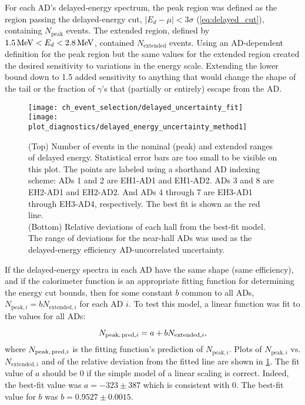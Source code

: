 For each AD's delayed-energy spectrum, the peak region was defined as
the region passing the delayed-energy cut, $\vert E_d-\mu \vert < 3\sigma$
(\cref{eq:delayed_cut}), containing $N_\text{peak}$ events.
The extended region, defined by
$\SI{1.5}{\mega\electronvolt} < E_d < \SI{2.8}{\mega\electronvolt}$,
contained $N_\text{extended}$ events.
Using an AD-dependent definition for the peak region but
the same values for the extended region created
the desired sensitivity to variations in the energy scale.
Extending the lower bound down to \SI{1.5}{\mev} added sensitivity to
anything that would change the shape of the tail
or the fraction of $\gamma$'s that (partially or entirely) escape from the AD.

\begin{figure}
    \centering
    \texttt{[image: ch\_event\_selection/delayed\_uncertainty\_fit]}\\
    \texttt{[image: plot\_diagnostics/delayed\_energy\_uncertainty\_method1]}
    \caption[Delayed energy efficiency uncertainty]{
        (Top) Number of events in the nominal (peak)
        and extended ranges of delayed energy.
        Statistical error bars are too small to be visible on this plot.
        The points are labeled using a shorthand AD indexing scheme:
        ADs 1 and 2 are EH1-AD1 and EH1-AD2. ADs 3 and 8 are EH2-AD1 and EH2-AD2.
        And ADs 4 through 7 are EH3-AD1 through EH3-AD4, respectively.
        The best fit is shown as the red line.\\
        (Bottom) Relative deviations of each hall from the best-fit model.
        The range of deviations for the near-hall ADs
        was used as the delayed-energy efficiency AD-uncorrelated uncertainty.
    }
    \label{fig:delayed_eff_unc_fit}
\end{figure}


If the delayed-energy spectra in each AD have the same shape (same efficiency),
and if the calorimeter function is an appropriate fitting function
for determining the energy cut bounds,
then for some constant $b$ common to all ADs,
$N_{\text{peak},i} = b N_{\text{extended},i}$ for each AD $i$.
To test this model, a linear function was fit
to the values for all ADs:

\begin{equation}
    N_{\text{peak,\,pred},i} = a + b N_{\text{extended},i},
\end{equation}
where $N_{\text{peak,\,pred},i}$ is the fitting function's prediction
of $N_{\text{peak},i}$.
Plots of $N_{\text{peak},i}$ vs. $N_{\text{extended},i}$ and of the
relative deviation from the fitted line are shown in \cref{fig:delayed_eff_unc_fit}.
The fit value of $a$ should be $0$ if the simple model of
a linear scaling is correct.
Indeed, the best-fit value was $a = -323 \pm 387$
which is consistent with $0$.
The best-fit value for $b$ was $b = 0.9527 \pm 0.0015$.

